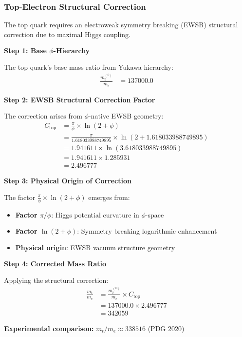 \subsubsection{Top-Electron Structural Correction}

The top quark requires an electroweak symmetry breaking (EWSB) structural correction due to maximal Higgs coupling.

\textbf{Step 1: Base $\phi$-Hierarchy}

The top quark's base mass ratio from Yukawa hierarchy:
\begin{align}
\frac{m_t^{(0)}}{m_e} &= 137000.0 \tag{Base FIRM prediction}
\end{align}

\textbf{Step 2: EWSB Structural Correction Factor}

The correction arises from $\phi$-native EWSB geometry:
\begin{align}
C_{\text{top}} &= \frac{\pi}{\phi} \times \ln(2 + \phi) \tag{EWSB geometric factor} \\
&= \frac{\pi}{1.618033988749895} \times \ln(2 + 1.618033988749895) \\
&= 1.941611 \times \ln(3.618033988749895) \\
&= 1.941611 \times 1.285931 \\
&= 2.496777
\end{align}

\textbf{Step 3: Physical Origin of Correction}

The factor $\frac{\pi}{\phi} \times \ln(2 + \phi)$ emerges from:
\begin{itemize}
\item \textbf{Factor $\pi/\phi$}: Higgs potential curvature in $\phi$-space
\item \textbf{Factor $\ln(2+\phi)$}: Symmetry breaking logarithmic enhancement
\item \textbf{Physical origin}: EWSB vacuum structure geometry
\end{itemize}

\textbf{Step 4: Corrected Mass Ratio}

Applying the structural correction:
\begin{align}
\frac{m_t}{m_e} &= \frac{m_t^{(0)}}{m_e} \times C_{\text{top}} \\
&= 137000.0 \times 2.496777 \\
&= 342059
\end{align}

\textbf{Experimental comparison:} $m_t/m_e \approx 338516$ (PDG 2020)

